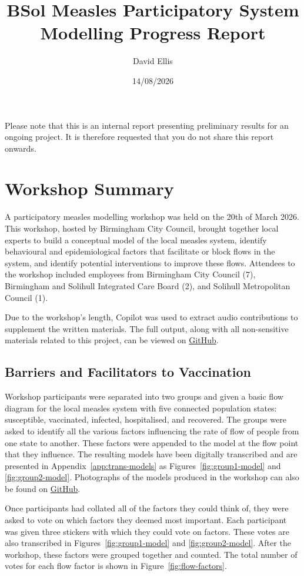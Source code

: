 \documentclass{article}
\title{BSol Measles Participatory System Modelling Progress Report}
\author{David Ellis}
\date{14/08/2026}
\begin{document}
\maketitle

Please note that this is an internal report presenting preliminary results for an ongoing project. It is therefore requested that you do not share this report onwards.

\section{Workshop Summary}

A participatory measles modelling workshop was held on the 20th of March 2026. This workshop, hosted by Birmingham City Council, brought together local experts to build a conceptual model of the local measles system, identify behavioural and epidemiological factors that facilitate or block flows in the system, and identify potential interventions to improve these flows. Attendees to the workshop included employees from Birmingham City Council (7), Birmingham and Solihull Integrated Care Board (2), and Solihull Metropolitan Council (1).

Due to the workshop's length, Copilot was used to extract audio contributions to supplement the written materials. The full output, along with all non-sensitive materials related to this project, can be viewed on  \href{https://github.com/David-Ellis/Measles-System-Dynamics-BSol}{GitHub}. 

\subsection{Barriers and Facilitators to Vaccination}

Workshop participants were separated into two groups and given a basic flow diagram for the local measles system with five connected population states: susceptible, vaccinated, infected, hospitalised, and recovered. The groups were asked to identify all the various factors influencing the rate of flow of people from one state to another. These factors were appended to the model at the flow point that they influence. The resulting models have been digitally transcribed and are presented in Appendix~\ref{app:trans-models} as Figures~\ref{fig:group1-model} and \ref{fig:group2-model}. Photographs of the models produced in the workshop can also be found on \href{https://github.com/David-Ellis/Measles-System-Dynamics-BSol}{GitHub}.

Once participants had collated all of the factors they could think of, they were asked to vote on which factors they deemed most important. Each participant was given three stickers with which they could vote on factors. These votes are also transcribed in Figures~\ref{fig:group1-model} and \ref{fig:group2-model}. After the workshop, these factors were grouped together and counted. The total number of votes for each flow factor is shown in Figure~\ref{fig:flow-factors}. 
\end{document}
